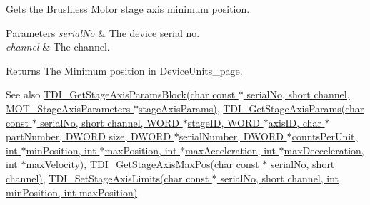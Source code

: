 Gets the Brushless Motor stage axis minimum position. 


\begin{DoxyParams}{Parameters}
{\em serial\+No} & The device serial no. \\
\hline
{\em channel} & The channel. \\
\hline
\end{DoxyParams}
\begin{DoxyReturn}{Returns}
The Minimum position in Device\+Units\+\_\+page. 
\end{DoxyReturn}
\begin{DoxySeeAlso}{See also}
\hyperlink{group___t_d_i_engine_ga5636c0d01d8b30ee1332ec910e7d0617}{T\+D\+I\+\_\+\+Get\+Stage\+Axis\+Params\+Block(char const $\ast$ serial\+No, short channel, M\+O\+T\+\_\+\+Stage\+Axis\+Parameters $\ast$stage\+Axis\+Params)}, \hyperlink{group___t_d_i_engine_ga71e0fcdc74159efe0131e2edb1689a79}{T\+D\+I\+\_\+\+Get\+Stage\+Axis\+Params(char const $\ast$ serial\+No, short channel, W\+O\+R\+D $\ast$stage\+I\+D, W\+O\+R\+D $\ast$axis\+I\+D, char $\ast$ part\+Number, D\+W\+O\+R\+D size, D\+W\+O\+R\+D $\ast$serial\+Number, D\+W\+O\+R\+D $\ast$counts\+Per\+Unit, int $\ast$min\+Position, int $\ast$max\+Position, int $\ast$max\+Acceleration, int $\ast$max\+Decceleration, int $\ast$max\+Velocity)}, \hyperlink{group___t_d_i_engine_ga94252c16ebf5913abdcbf75e10f3f17e}{T\+D\+I\+\_\+\+Get\+Stage\+Axis\+Max\+Pos(char const $\ast$ serial\+No, short channel)}, \hyperlink{group___t_d_i_engine_ga1eeea5a4e66cdf13d0e7f182f18ab1b1}{T\+D\+I\+\_\+\+Set\+Stage\+Axis\+Limits(char const $\ast$ serial\+No, short channel, int min\+Position, int max\+Position)}


\end{DoxySeeAlso}
